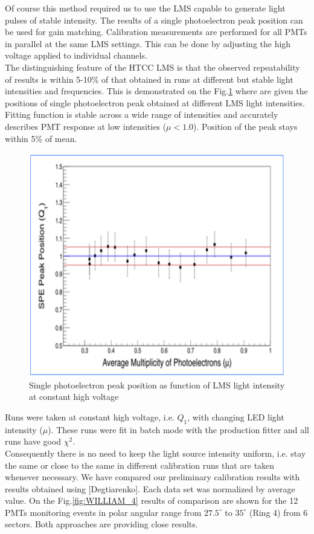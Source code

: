 Of course this method required us to use the LMS capable to generate light pulses of stable intensity. The results of a single photoelectron peak position can be used for gain matching. Calibration measurements are performed for all PMTs in parallel at the same LMS settings. This can be done by adjusting the high voltage applied to individual channels. \\
\indent The distinguishing feature of the HTCC LMS is that the observed repeatability of results is within 5-10\% of that obtained in runs at different but stable light intensities and frequencies. This is demonstrated on the Fig.\ref{fig:WILLIAM_5}
where are given the positions of single photoelectron peak obtained at different LMS light intensities. Fitting function is stable across a wide range of intensities and accurately describes PMT response at low intensities ($\mu<1.0$). Position of the peak stays within 5\% of mean.

\begin{figure}[ht]
\centering
\includegraphics[width=0.99\linewidth]{images/WILLIAM_5.png}
\caption{Single photoelectron peak position as function of LMS light intensity at constant high voltage}
\label{fig:WILLIAM_5}
\end{figure}

Runs were taken at constant high voltage, i.e. $Q_{ 1}$, with changing LED light intensity ($\mu$). These runs were fit in batch mode with the production fitter and all runs have good $\chi{^2}$.\\ 
\indent Consequently there is no need to keep the light source intensity uniform, i.e. stay the same or close to the same in different calibration runs that are taken whenever necessary.
We have compared our preliminary calibration results with results obtained using [Degtiarenko]. Each data set was normalized by average value. On the Fig.\ref{fig:WILLIAM_4} results of comparison are shown for the 12 PMTs monitoring events in polar angular range from $27.5^\circ$ to $35^\circ$ (Ring 4) from 6 sectors. Both approaches are providing close results.

